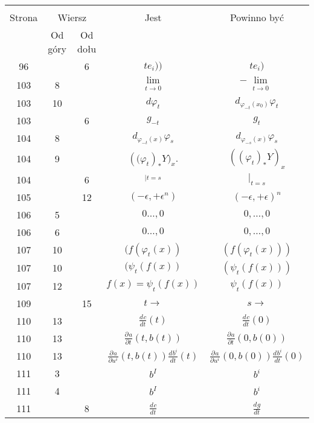 \documentclass[a4paper,11pt]{article}
\newcommand{\Lim}{\lim\limits}
\newcommand{\pr}{\partial}
\newcommand{\ra}{\rightarrow}
\newcommand{\ld}{\ldots}
\newcommand{\eps}{\epsilon}
\newcommand{\vp}{\varphi}
\newcommand{\dd}[3]{\frac{ d^{ #1 } { #2 } }{ d { #3 }^{ #1 } }}
\newcommand{\pd}[3]{\frac{ \pr^{ #1 } { #2 } }{ \pr { #3 }^{ #1 } }}
\begin{document}
\begin{center}
  \begin{tabular}{|c|c|c|c|c|}
    \hline
    & \multicolumn{2}{c|}{} & & \\
    Strona & \multicolumn{2}{c|}{Wiersz}& Jest & Powinno być \\ \cline{2-3}
    & Od góry & Od dołu &  &  \\ \hline
    96 & & 6 & $t e_{ i } ))$ & $t e_{ i } )$ \\
    103 & 8 & & $\Lim_{ \substack{ t \ra 0 } }$
           & $-\Lim_{ \substack{ t \ra 0 } }$ \\
    103 & 10 & & $d \vp_{ t }$ & $d_{ \vp_{ -t }( x_{ 0 } ) } \vp_{ t }$ \\
    103 & & 6 & $g_{ -t }$ & $g_{ t }$ \\
    104 & 8 & & $d_{ \vp_{ -t }( x ) } \vp_{ s }$
           & $d_{ \vp_{ -s }( x ) } \vp_{ s }$ \\
    104 & 9 & & $( \big( \vp_{ t } )_{*} Y \big)_{ x }$.
           & $( ( \vp_{ t } )_{ * } Y )_{ x }$ \\
    104 & & 6 & $_{ | t = s }$ & $|_{ t = s }$ \\
    105 & & 12 & $( - \eps, + \eps^{ n } )$ & $( -\eps, +\eps )^{ n }$ \\
    106 &  5 & & $0\ld, 0$ & $0, \ld, 0$ \\
    106 &  6 & & $0\ld, 0$ & $0, \ld, 0$ \\
    107 & 10 & & $( f( \vp_{ t }( x ) )$ & $( f( \vp_{ t }( x ) ) )$ \\
    107 & 10 & & $( \psi_{ t } ( f( x ) )$ & $( \psi_{ t } ( f( x ) ) )$ \\
    107 & 12 & & $f( x ) = \psi_{ t } ( f( x ) )$
           & $\psi_{ t } ( f( x ) )$ \\
    109 & & 15 & $t \ra$ & $s \ra$ \\
    110 & 13 & & $\dd{}{ c }{ t }( t )$ & $\dd{}{ c }{ t }( 0 )$ \\
    110 & 13 & & $\pd{}{ a }{ t }( t, b( t ) )$
           & $\pd{}{ a }{ t }( 0, b( 0 ) )$ \\
    110 & 13 & & $\pd{}{ a }{ { u^{ i } } }( t, b( t ) )
                 \dd{}{ { b^{ i } } }{ t }( t )$
           & $\pd{}{ a }{ { u^{ i } } }( 0, b( 0 ) )
             \dd{}{ { b^{ i } } }{ t }( 0 )$ \\
    111 & 3 & & $b^{ I }$ & $b^{ i }$ \\
    111 & 4 & & $b^{ I }$ & $b^{ i }$ \\
    111 & &  8 & $\dd{}{ c }{ t }$ & $\dd{}{ g }{ t }$ \\

\end{tabular}
\end{center}
\end{document}
